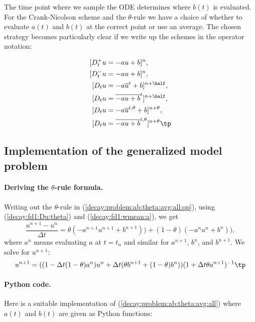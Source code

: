 \documentclass[graybox,sectrefs,envcountresetchap,open=right,final]{svmonodo}
\begin{document}
The time point where we sample the ODE determines where $b(t)$ is
evaluated. For the Crank-Nicolson scheme and the $\theta$-rule we
have a choice of whether to evaluate $a(t)$ and $b(t)$ at the
correct point or use an average. The chosen strategy becomes
particularly clear if we write up the schemes in the operator notation:

\begin{align}
\lbrack D^+_t u &= -au + b\rbrack^n,\\ 
\lbrack D^-_t u &= -au + b\rbrack^n,\\ 
\lbrack D_t u   &= -a\overline{u}^t + b\rbrack^{n+\half},\\ 
\lbrack D_t u   &= \overline{-au+b}^t\rbrack^{n+\half},\\ 
\lbrack D_t u   &= -a\overline{u}^{t,\theta} + b\rbrack^{n+\theta},\\ 
\lbrack D_t u   &= \overline{-au+b}^{t,\theta}\rbrack^{n+\theta}
\label{decay:problem:ab:theta:avg:all:op}
\tp
\end{align}

\subsection{Implementation of the generalized model problem}
\label{decay:general}

\paragraph{Deriving the $\theta$-rule formula.}
Writing out the $\theta$-rule in (\ref{decay:problem:ab:theta:avg:all:op}),
using (\ref{decay:fd1:Du:theta})
and (\ref{decay:fd1:wmean:a}), we get
\begin{equation}
\frac{u^{n+1}-u^n}{\Delta t} = \theta(-a^{n+1}u^{n+1} + b^{n+1}))
+ (1-\theta)(-a^nu^{n} + b^n)),
\label{decay:problem:ab:theta:avg:all}
\end{equation}
where $a^n$ means evaluating $a$ at $t=t_n$ and similar for
$a^{n+1}$, $b^n$, and $b^{n+1}$.
We solve for $u^{n+1}$:
\begin{equation}
u^{n+1} = ((1 - \Delta t(1-\theta)a^n)u^n
+ \Delta t(\theta b^{n+1} + (1-\theta)b^n))(1 + \Delta t\theta a^{n+1})^{-1}
\tp
\end{equation}

\paragraph{Python code.}
Here is a suitable implementation of (\ref{decay:problem:ab:theta:avg:all})
where $a(t)$ and $b(t)$ are given as
Python functions:
\end{document}
